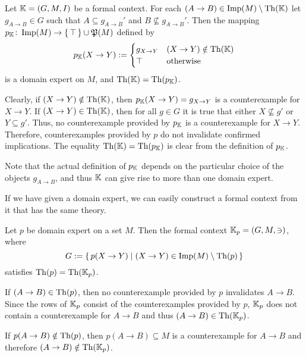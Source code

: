 \begin{Proposition}
  \label{prop:domain-expert-from-domain}
  Let ${\mathbb{K}} = (G, M, I)$ be a formal context.  For each $(A \to B) \in \operatorname{Imp}(M) \setminus
  \operatorname{Th}({\mathbb{K}})$ let $g_{A \to B} \in G$ such that $A \subseteq g_{A \to B}'$ and $B
  \not\subseteq g_{A \to B}'$.  Then the mapping $p_{{\mathbb{K}}} \colon \operatorname{Imp}(M) \to {\ensuremath{\{\, \top
  \,\}}} \cup {\ensuremath{\mathfrak{P}(M)}}$ defined by
  \begin{equation*}
    p_{{\mathbb{K}}}(X \to Y) :=
    \begin{cases}
      g_{X \to Y} & (X \to Y) \notin \operatorname{Th}({\mathbb{K}}) \\
      \top & \text{otherwise}
    \end{cases}
  \end{equation*}
  is a domain expert on $M$, and $\operatorname{Th}({\mathbb{K}}) = \operatorname{Th}(p_{{\mathbb{K}}})$.
\end{Proposition}
\begin{Proof}
  Clearly, if $(X \to Y) \notin \operatorname{Th}({\mathbb{K}})$, then $p_{{\mathbb{K}}}(X \to Y) = g_{X \to Y}$ is
  a counterexample for $X \to Y$.  If $(X \to Y) \in \operatorname{Th}({\mathbb{K}})$, then for all $g \in G$
  it is true that either $X \not\subseteq g'$ or $Y \subseteq g'$.  Thus, no
  counterexample provided by $p_{{\mathbb{K}}}$ is a counterexample for $X \to Y$.  Therefore,
  counterexamples provided by $p$ do not invalidate confirmed implications.  The equality
  $\operatorname{Th}({\mathbb{K}}) = \operatorname{Th}(p_{{\mathbb{K}}})$ is clear from the definition of $p_{{\mathbb{K}}}$.
\end{Proof}

Note that the actual definition of $p_{{\mathbb{K}}}$ depends on the particular choice of the
objects $g_{A \to B}$, and thus ${\mathbb{K}}$ can give rise to more than one domain expert.

If we have given a domain expert, we can easily construct a formal context from it that
has the same theory.

\begin{Proposition}
  \label{prop:domain-from-domain-expert}
  Let $p$ be domain expert on a set $M$.  Then the formal context ${\mathbb{K}}_p = (G, M, \ni)$,
  where
  \begin{equation*}
    G := {\{\, p(X \to Y) \mid (X \to Y) \in \operatorname{Imp}(M) \setminus \operatorname{Th}(p) \,\}}
  \end{equation*}
  satisfies $\operatorname{Th}(p) = \operatorname{Th}({\mathbb{K}}_p)$.
\end{Proposition}
\begin{Proof}
  If $(A \to B) \in \operatorname{Th}(p)$, then no counterexample provided by $p$ invalidates $A \to
  B$.  Since the rows of ${\mathbb{K}}_p$ consist of the counterexamples provided by $p$, ${\mathbb{K}}_p$ does not contain a counterexample for $A \to B$ and thus $(A \to B) \in \operatorname{Th}({\mathbb{K}}_p)$.

  If $p(A \to B) \notin \operatorname{Th}(p)$, then $p(A \to B) \subseteq M$ is a counterexample for $A
  \to B$ and therefore $(A \to B) \notin \operatorname{Th}({\mathbb{K}}_p)$.
\end{Proof}

